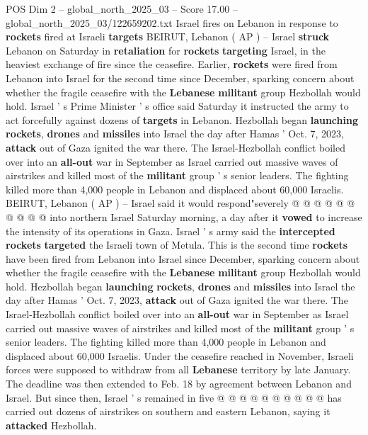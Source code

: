 \begin{textsample}{POS Dim 2 – global\_north\_2025\_03 – Score 17.00 – global\_north\_2025\_03/122659202.txt}  \label{ex:f2_pos_416}
Israel fires on Lebanon in response to \textbf{rockets} fired at Israeli \textbf{targets} BEIRUT, Lebanon ( AP ) -- Israel \textbf{struck} Lebanon on Saturday in \textbf{retaliation} for \textbf{rockets} \textbf{targeting} Israel, in the heaviest exchange of fire since the ceasefire.
Earlier, \textbf{rockets} were fired from Lebanon into Israel for the second time since December, sparking concern about whether the fragile ceasefire with the \textbf{Lebanese} \textbf{militant} group Hezbollah would hold.
Israel ' s Prime Minister ' s office said Saturday it instructed the army to act forcefully against dozens of \textbf{targets} in Lebanon.
Hezbollah began \textbf{launching} \textbf{rockets}, \textbf{drones} and \textbf{missiles} into Israel the day after Hamas ' Oct. 7, 2023, \textbf{attack} out of Gaza ignited the war there.
The Israel-Hezbollah conflict boiled over into an \textbf{all-out} war in September as Israel carried out massive waves of airstrikes and killed most of the \textbf{militant} group ' s senior leaders.
The fighting killed more than 4,000 people in Lebanon and displaced about 60,000 Israelis.
BEIRUT, Lebanon ( AP ) -- Israel said it would respond"severely @ @ @ @ @ @ @ @ @ @ into northern Israel Saturday morning, a day after it \textbf{vowed} to increase the intensity of its operations in Gaza.
Israel ' s army said the \textbf{intercepted} \textbf{rockets} \textbf{targeted} the Israeli town of Metula.
This is the second time \textbf{rockets} have been fired from Lebanon into Israel since December, sparking concern about whether the fragile ceasefire with the \textbf{Lebanese} \textbf{militant} group Hezbollah would hold.
Hezbollah began \textbf{launching} \textbf{rockets}, \textbf{drones} and \textbf{missiles} into Israel the day after Hamas ' Oct. 7, 2023, \textbf{attack} out of Gaza ignited the war there.
The Israel-Hezbollah conflict boiled over into an \textbf{all-out} war in September as Israel carried out massive waves of airstrikes and killed most of the \textbf{militant} group ' s senior leaders.
The fighting killed more than 4,000 people in Lebanon and displaced about 60,000 Israelis.
Under the ceasefire reached in November, Israeli forces were supposed to withdraw from all \textbf{Lebanese} territory by late January.
The deadline was then extended to Feb. 18 by agreement between Lebanon and Israel.
But since then, Israel ' s remained in five @ @ @ @ @ @ @ @ @ @ has carried out dozens of airstrikes on southern and eastern Lebanon, saying it \textbf{attacked} Hezbollah.

\end{textsample}
